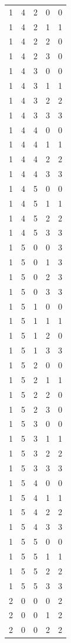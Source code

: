 \begin{longtable}{rrrrr}
1 & 4 & 2 & 0 & 0 \\
1 & 4 & 2 & 1 & 1 \\
1 & 4 & 2 & 2 & 0 \\
1 & 4 & 2 & 3 & 0 \\
1 & 4 & 3 & 0 & 0 \\
1 & 4 & 3 & 1 & 1 \\
1 & 4 & 3 & 2 & 2 \\
1 & 4 & 3 & 3 & 3 \\
1 & 4 & 4 & 0 & 0 \\
1 & 4 & 4 & 1 & 1 \\
1 & 4 & 4 & 2 & 2 \\
1 & 4 & 4 & 3 & 3 \\
1 & 4 & 5 & 0 & 0 \\
1 & 4 & 5 & 1 & 1 \\
1 & 4 & 5 & 2 & 2 \\
1 & 4 & 5 & 3 & 3 \\
1 & 5 & 0 & 0 & 3 \\
1 & 5 & 0 & 1 & 3 \\
1 & 5 & 0 & 2 & 3 \\
1 & 5 & 0 & 3 & 3 \\
1 & 5 & 1 & 0 & 0 \\
1 & 5 & 1 & 1 & 1 \\
1 & 5 & 1 & 2 & 0 \\
1 & 5 & 1 & 3 & 3 \\
1 & 5 & 2 & 0 & 0 \\
1 & 5 & 2 & 1 & 1 \\
1 & 5 & 2 & 2 & 0 \\
1 & 5 & 2 & 3 & 0 \\
1 & 5 & 3 & 0 & 0 \\
1 & 5 & 3 & 1 & 1 \\
1 & 5 & 3 & 2 & 2 \\
1 & 5 & 3 & 3 & 3 \\
1 & 5 & 4 & 0 & 0 \\
1 & 5 & 4 & 1 & 1 \\
1 & 5 & 4 & 2 & 2 \\
1 & 5 & 4 & 3 & 3 \\
1 & 5 & 5 & 0 & 0 \\
1 & 5 & 5 & 1 & 1 \\
1 & 5 & 5 & 2 & 2 \\
1 & 5 & 5 & 3 & 3 \\
2 & 0 & 0 & 0 & 2 \\
2 & 0 & 0 & 1 & 2 \\
2 & 0 & 0 & 2 & 2 \\

\end{longtable}
